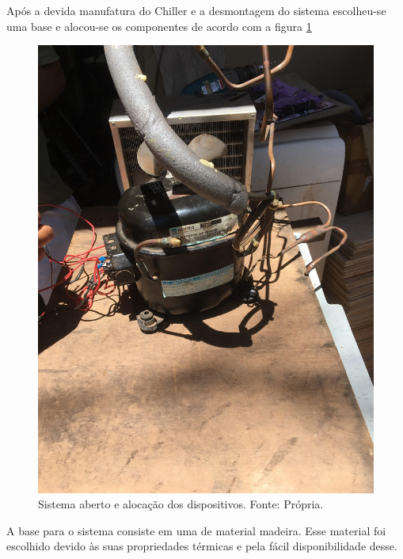                         Após a devida manufatura do Chiller e a desmontagem do sistema escolheu-se uma
                        base e alocou-se os componentes de acordo com a figura \ref{alocacao-dispositivos} 

                        \begin{figure}[!htb]
                            \centering
                            \includegraphics[scale= 0.2]{figuras/alocacao-dispositivos.png}
                            \caption{Sistema aberto e alocação dos dispositivos. Fonte: Própria.}
                            \label{alocacao-dispositivos}
                        \end{figure}

                        A base para o sistema consiste em uma de material madeira. Esse material foi
                        escolhido devido às suas propriedades térmicas e pela fácil disponibilidade desse. 
                        
